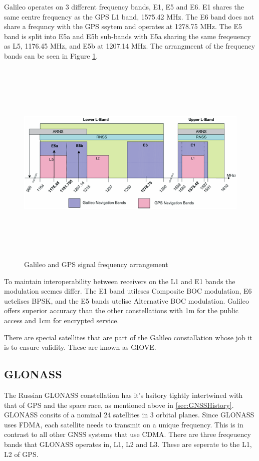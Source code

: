 Galileo operates on 3 different frequency bands, E1, E5 and E6. E1 shares the same centre frequency as the GPS L1 band, 1575.42 MHz. The E6 band does not share a frequncy
with the GPS ssytem and operates at 1278.75 MHz. The E5 band is split into E5a and E5b sub-bands with E5a sharing the same freqeuency as L5, 1176.45 MHz, and E5b at
1207.14 MHz. The arrangmeent of the frequency bands can be seen in Figure \ref{fig:SignalPlan}.

\begin{figure}[h]
    \begin{centering}
        \includegraphics[width=14cm,height=10cm,keepaspectratio]{Figures/Galileo_Frequency_Plan.png}
        \caption{Galileo and GPS signal frequency arrangement}
        \label{fig:SignalPlan}
    \end{centering}
\end{figure}

To maintain interoperability between receivers on the L1 and E1 bands the modulation scemes differ.
The E1 band utileses Composite BOC modulation, E6 uetelises BPSK, and the E5 bands utelise Alternative BOC modulation.
Galileo offers superior accuracy than the other constellations with 1m for the public access and 1cm for encrypted service.

There are special satellites that are part of the Galileo constallation whose job it is to ensure validity. These are known as GIOVE. 

\subsection{GLONASS} \label{subsec:GNSS_GLONASSIntro}
The Russian GLONASS constellation has it's hsitory tightly intertwined with that of GPS and the space race, as mentioned above in \ref{sec:GNSSHistory}.
GLONASS consits of a nominal 24 satellites in 3 orbital planes. Since GLONASS uses FDMA, each satellite needs to transmit on a unique frequency. This is in contrast to
all other GNSS systems that use CDMA. There are three freqeuency bands that GLONASS operates in, L1, L2 and L3. These are seperate to the L1, L2 of GPS. 

